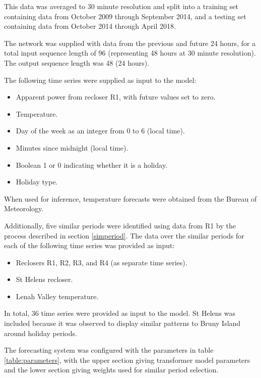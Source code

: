 \documentclass[conference]{IEEEtran}
\begin{document}
This data was averaged to 30 minute resolution and split into a training set containing data from October 2009 through September 2014, and a testing set containing data from October 2014 through April 2018.

The network was supplied with data from the previous and future 24 hours, for a total input sequence length of 96 (representing 48 hours at 30 minute resolution).
The output sequence length was 48 (24 hours).

The following time series were supplied as input to the model:
\begin{itemize}
	\item Apparent power from recloser R1, with future values set to zero.
	\item Temperature.
	\item Day of the week as an integer from 0 to 6 (local time).
	\item Minutes since midnight (local time).
	\item Boolean 1 or 0 indicating whether it is a holiday.
	\item Holiday type.
\end{itemize}

When used for inference, temperature forecasts were obtained from the Bureau of Meteorology.

Additionally, five similar periods were identified using data from R1 by the process described in section \ref{simperiod}.
The data over the similar periods for each of the following time series was provided as input:
\begin{itemize}
	\item Reclosers R1, R2, R3, and R4 (as separate time series).
	\item St Helens recloser.
	\item Lenah Valley temperature.
\end{itemize}

In total, 36 time series were provided as input to the model.
St Helens was included because it was observed to display similar patterns to Bruny Island around holiday periods.

The forecasting system was configured with the parameters in table \ref{table:parameters}, with the upper section giving transformer model parameters and the lower section giving weights used for similar period selection.
\end{document}
